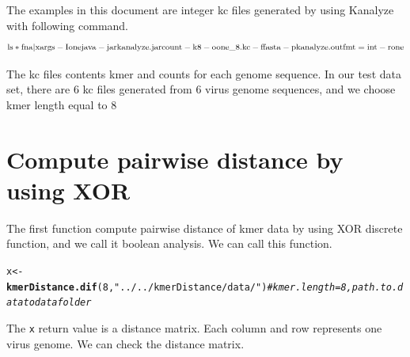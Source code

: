 \documentclass{article}\usepackage[]{graphicx}\usepackage[]{color}
\makeatletter
\newcommand{\hlnum}[1]{\textcolor[rgb]{0.686,0.059,0.569}{#1}}%
\newcommand{\hlstr}[1]{\textcolor[rgb]{0.192,0.494,0.8}{#1}}%
\newcommand{\hlcom}[1]{\textcolor[rgb]{0.678,0.584,0.686}{\textit{#1}}}%
\newcommand{\hlstd}[1]{\textcolor[rgb]{0.345,0.345,0.345}{#1}}%
\newcommand{\hlkwb}[1]{\textcolor[rgb]{0.69,0.353,0.396}{#1}}%
\newcommand{\hlkwd}[1]{\textcolor[rgb]{0.737,0.353,0.396}{\textbf{#1}}}%
\newenvironment{kframe}{%
 \def\at@end@of@kframe{}%
 \ifinner\ifhmode%
  \def\at@end@of@kframe{\end{minipage}}%
  \begin{minipage}{\columnwidth}%
 \fi\fi%
 \def\FrameCommand##1{\hskip\@totalleftmargin \hskip-\fboxsep
 \colorbox{shadecolor}{##1}\hskip-\fboxsep
     \hskip-\linewidth \hskip-\@totalleftmargin \hskip\columnwidth}%
 \MakeFramed {\advance\hsize-\width
   \@totalleftmargin\z@ \linewidth\hsize
   \@setminipage}}%
 {\par\unskip\endMakeFramed%
 \at@end@of@kframe}
\newenvironment{knitrout}{}{} %
\makeatother
\begin{document}
The examples in this document are integer kc files generated by using Kanalyze\cite{Audano:2014aa} with following command.
\[{\rm{ls *fna | xargs  - I one java  - jar kanalyze.jar count  - k 8  - o one\_8.kc  - f fasta  - p kanalyze.outfmt = int  - r one}}\]

The kc files contents kmer and counts for each genome sequence. In our test data set, there are 6 kc files generated from 6 virus genome sequences, and we choose kmer length equal to 8

\section{Compute pairwise distance by using XOR}
\label{kmerDistance.dif}

The first function  compute pairwise distance of kmer data by using XOR discrete function, and we call it boolean analysis. We can call this function.

\begin{knitrout}
\color{fgcolor}\begin{kframe}
\begin{alltt}
\hlstd{x} \hlkwb{<-} \hlkwd{kmerDistance.dif}\hlstd{(}\hlnum{8}\hlstd{,}\hlstr{"../../kmerDistance/data/"}\hlstd{)} \hlcom{#kmer.length = 8, path.to.data to data folder}
\end{alltt}
\end{kframe}
\end{knitrout}

The \texttt{x} return value is a distance matrix. Each column and row represents one virus genome. We can check the distance matrix.
\end{document}
